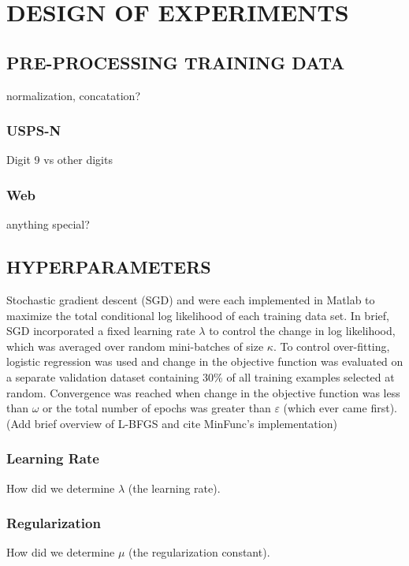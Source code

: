 \section{DESIGN OF EXPERIMENTS}
\label{sec:experiments}

\subsection{PRE-PROCESSING TRAINING DATA}
normalization, concatation?

\subsubsection{USPS-N}
Digit 9 vs other digits

\subsubsection{Web}
anything special?



\subsection{HYPERPARAMETERS}

Stochastic gradient descent (SGD) and  were each implemented in Matlab to maximize the total conditional log likelihood of each training data set. In brief, SGD incorporated a fixed learning rate $\lambda$ to control the change in log likelihood, which was averaged over random mini-batches of size $\kappa$. To control over-fitting, logistic regression was used and change in the objective function was evaluated on a separate validation dataset containing 30\% of all training examples selected at random. Convergence was reached when change in the objective function was less than $\omega$ or the total number of epochs was greater than $\varepsilon$ (which ever came first). (Add brief overview of L-BFGS and cite MinFunc's implementation)



\subsubsection{Learning Rate}
How did we determine $\lambda$ (the learning rate).

\subsubsection{Regularization}
How did we determine $\mu$ (the regularization constant).




